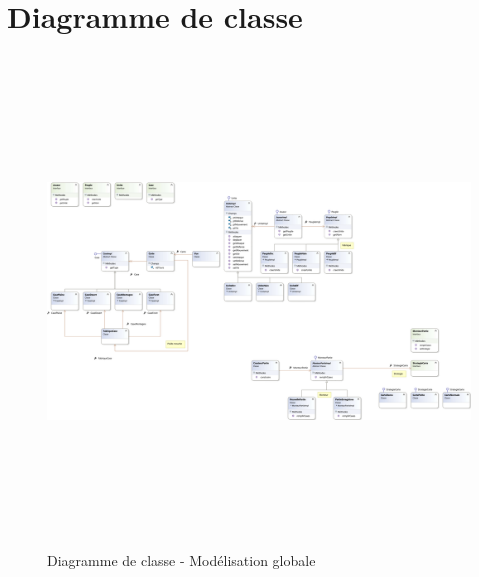 \documentclass[a4paper,11pt]{article}
\begin{document}
\section{Diagramme de classe}
\vspace*{0.5cm}
\lipsum[1]
\vspace*{0.5cm}
\begin{figure}[ht!]
\includegraphics[height=13cm,width=15cm]{classe.png}
\caption{Diagramme de classe - Modélisation globale}
\label{fig:classe}
\end{figure}
\newpage
\end{document}
